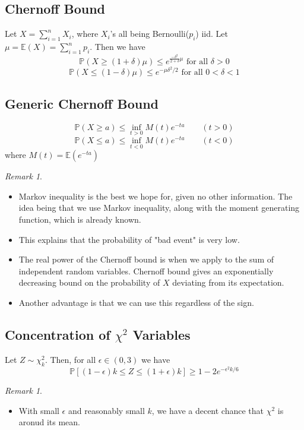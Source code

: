 \documentclass[11pt,reqno]{amsart}
\theoremstyle{remark}
\newtheorem{remark}[example]{Remark}
\begin{document}
\subsection*{Chernoff Bound}
Let $X=\sum^n_{i=1}X_i$, where $X_i$'s all being Bernoulli($p_i$) iid. Let $\mu=\mathbb{E}(X)=\sum^n_{i=1}p_i$.
 Then we have
\begin{equation}
\mathbb{P}(X\geq (1+\delta)\mu)\leq e^{\frac{-\delta^2}{2+\delta}\mu}\text{ for all }\delta>0
\end{equation}
\begin{equation}
\mathbb{P}(X\leq (1-\delta)\mu)\leq e^{-\mu\delta^2/2}\text{ for all }0<\delta<1
\end{equation}

\subsection*{Generic Chernoff Bound}
\begin{equation}
\mathbb{P} \left(X \geq a\right) \leq \inf_{t > 0} M(t) e^{-t a} \qquad (t > 0)
\end{equation}
\begin{equation}
\mathbb{P} (X\leq a) \leq \inf_{t<0} M(t) e^{-t a} \qquad (t < 0)
\end{equation}
where $M(t)=\mathbb{E}(e^{-ta})$
\begin{remark}
\begin{itemize}
\item Markov inequality is the best we hope for, given no other information. The idea being that we use Markov inequality, along with the moment generating function, which is already known.
\item This explains that the probability of "bad event" is very low.
\item The real power of the Chernoff bound is when we apply to the sum of independent random variables.
 Chernoff bound gives an exponentially decreasing bound on the probability of $X$ deviating from its expectation.
\item Another advantage is that we can use this regardless of the sign.
\end{itemize}
\end{remark}
\subsection*{Concentration of $\chi^2$ Variables}
Let $Z \sim\chi_k^2$. Then, for all $\epsilon\in (0,3)$ we have
\[
\mathbb{P}[(1-\epsilon)k\leq Z\leq (1+\epsilon)k]\geq 1-2e^{-\epsilon^2k/6}
\]
\begin{remark}
\begin{itemize}
\item With small $\epsilon$ and reasonably small $k$, we have a decent chance 
that $\chi^2$ is aronud its mean.
\end{itemize}
\end{remark}
\end{document}
